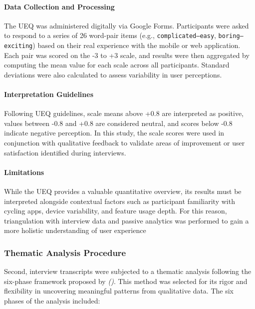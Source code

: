 \paragraph{Data Collection and Processing}

The UEQ was administered digitally via Google Forms. Participants were asked to respond to a series of 26 word-pair items (e.g., \texttt{complicated–easy}, \texttt{boring–exciting}) based on their real experience with the mobile or web application. Each pair was scored on the -3 to +3 scale, and results were then aggregated by computing the mean value for each scale across all participants. Standard deviations were also calculated to assess variability in user perceptions.

\paragraph{Interpretation Guidelines}

Following UEQ guidelines, scale means above +0.8 are interpreted as positive, values between -0.8 and +0.8 are considered neutral, and scores below -0.8 indicate negative perception. In this study, the scale scores were used in conjunction with qualitative feedback to validate areas of improvement or user satisfaction identified during interviews.

\paragraph{Limitations}

While the UEQ provides a valuable quantitative overview, its results must be interpreted alongside contextual factors such as participant familiarity with cycling apps, device variability, and feature usage depth. For this reason, triangulation with interview data and passive analytics was performed to gain a more holistic understanding of user experience

\subsubsection{Thematic Analysis Procedure}

Second, interview transcripts were subjected to a thematic analysis following the six-phase framework proposed by \textit{\citeauthor{BraunClarke:2012} (\citeyear{BraunClarke:2012})}. This method was selected for its rigor and flexibility in uncovering meaningful patterns from qualitative data. The six phases of the analysis included:


